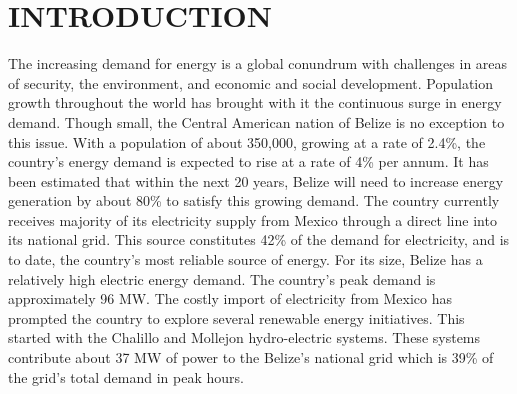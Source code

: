 \documentclass[twocolumn,10pt]{asme2e}
\begin{document}


\section*{INTRODUCTION}

The increasing demand for energy is a global conundrum with challenges in areas of security, the environment, and economic and social development.\cite{asmemanual} Population growth throughout the world has brought with it the continuous surge in energy demand. Though small, the Central American nation of Belize is no exception to this issue. With a population of about 350,000, growing at a rate of 2.4\%, the country's energy demand is expected to rise at a rate of 4\% per annum. It has been estimated that within the next 20 years, Belize will need to increase energy generation by about 80\% to satisfy this growing demand. The country currently receives majority of its electricity supply from Mexico through a direct line into its national grid. This source constitutes 42\% of the demand for electricity, and is to date, the country's most reliable source of energy. For its size, Belize has a relatively high electric energy demand. The country's peak demand is approximately 96 MW. The costly import of electricity from Mexico has prompted the country to explore several renewable energy initiatives. This started with the Chalillo and Mollejon hydro-electric systems. These systems contribute about 37 MW of power to the Belize's national grid which is 39\% of the grid's total demand in peak hours.
\end{document}
